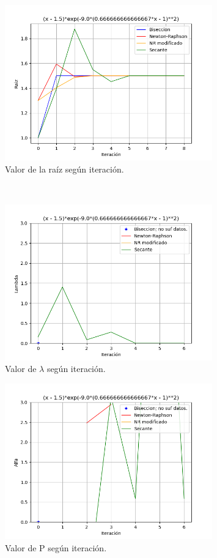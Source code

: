 \documentclass[titlepage,a4paper]{article}
\begin{document}
\begin{figure}[H]
\centering
\includegraphics[width=0.8\textwidth]{raiz f3.png}
\caption{\label{fig:class01}Valor de la raíz según iteración.}
\end{figure}
\\
\begin{figure}[H]
\centering
\includegraphics[width=0.8\textwidth]{lambda f3.png}
\caption{\label{fig:class01}Valor de $\lambda$ según iteración.}
\end{figure}
\begin{figure}[H]
\centering
\includegraphics[width=0.8\textwidth]{alfa f3.png}
\caption{\label{fig:class01}Valor de P según iteración.}
\end{figure}
\\%
\end{document}
